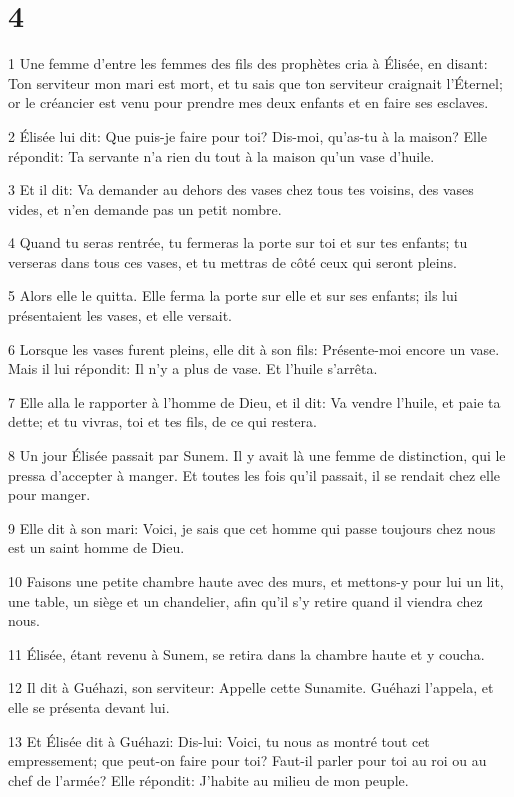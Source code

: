 \chapter{4}

\par 1 Une femme d'entre les femmes des fils des prophètes cria à Élisée, en disant: Ton serviteur mon mari est mort, et tu sais que ton serviteur craignait l'Éternel; or le créancier est venu pour prendre mes deux enfants et en faire ses esclaves.
\par 2 Élisée lui dit: Que puis-je faire pour toi? Dis-moi, qu'as-tu à la maison? Elle répondit: Ta servante n'a rien du tout à la maison qu'un vase d'huile.
\par 3 Et il dit: Va demander au dehors des vases chez tous tes voisins, des vases vides, et n'en demande pas un petit nombre.
\par 4 Quand tu seras rentrée, tu fermeras la porte sur toi et sur tes enfants; tu verseras dans tous ces vases, et tu mettras de côté ceux qui seront pleins.
\par 5 Alors elle le quitta. Elle ferma la porte sur elle et sur ses enfants; ils lui présentaient les vases, et elle versait.
\par 6 Lorsque les vases furent pleins, elle dit à son fils: Présente-moi encore un vase. Mais il lui répondit: Il n'y a plus de vase. Et l'huile s'arrêta.
\par 7 Elle alla le rapporter à l'homme de Dieu, et il dit: Va vendre l'huile, et paie ta dette; et tu vivras, toi et tes fils, de ce qui restera.
\par 8 Un jour Élisée passait par Sunem. Il y avait là une femme de distinction, qui le pressa d'accepter à manger. Et toutes les fois qu'il passait, il se rendait chez elle pour manger.
\par 9 Elle dit à son mari: Voici, je sais que cet homme qui passe toujours chez nous est un saint homme de Dieu.
\par 10 Faisons une petite chambre haute avec des murs, et mettons-y pour lui un lit, une table, un siège et un chandelier, afin qu'il s'y retire quand il viendra chez nous.
\par 11 Élisée, étant revenu à Sunem, se retira dans la chambre haute et y coucha.
\par 12 Il dit à Guéhazi, son serviteur: Appelle cette Sunamite. Guéhazi l'appela, et elle se présenta devant lui.
\par 13 Et Élisée dit à Guéhazi: Dis-lui: Voici, tu nous as montré tout cet empressement; que peut-on faire pour toi? Faut-il parler pour toi au roi ou au chef de l'armée? Elle répondit: J'habite au milieu de mon peuple.
